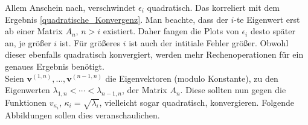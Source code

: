 Allem Anschein nach, verschwindet $\epsilon_i$ quadratisch. Das korreliert mit dem Ergebnis \eqref{quadratische_Konvergenz}. Man beachte, dass der $i$-te Eigenwert erst ab einer Matrix $A_n$, $n > i$ existiert. Daher fangen die Plots von $\epsilon_i$ desto später an, je größer $i$ ist. Für größeres $i$ ist auch der intitiale Fehler größer. Obwohl dieser ebenfalls quadratisch konvergiert, werden mehr Rechenoperationen für ein genaues Ergebnis benötigt. \\

Seien $\mathbf{v}^{(1, n)}, \ldots, \mathbf{v}^{(n-1, n)}$ die Eigenvektoren (modulo Konstante), zu den Eigenwerten $\lambda_{1, n} < \cdots < \lambda_{n-1, n}$, der Matrix $A_n$. Diese sollten nun gegen die Funktionen $v_{\kappa_i}$, $\kappa_i = \sqrt{\lambda_i}$, vielleicht sogar quadratisch, konvergieren. Folgende Abbildungen sollen dies veranschaulichen.


